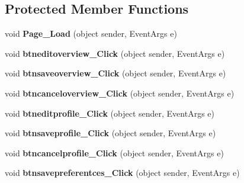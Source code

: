 \subsection*{Protected Member Functions}
\begin{DoxyCompactItemize}
\item 
\hypertarget{classadminusermanagement__details_a063fdab8b5231ee5413de3f8e4833907}{void {\bfseries Page\-\_\-\-Load} (object sender, Event\-Args e)}\label{classadminusermanagement__details_a063fdab8b5231ee5413de3f8e4833907}

\item 
\hypertarget{classadminusermanagement__details_ae156604de3f7c4ae0c2c5feb1bfb22c0}{void {\bfseries btneditoverview\-\_\-\-Click} (object sender, Event\-Args e)}\label{classadminusermanagement__details_ae156604de3f7c4ae0c2c5feb1bfb22c0}

\item 
\hypertarget{classadminusermanagement__details_a2552ef32ed38e4a1b41e90eeaeb07bff}{void {\bfseries btnsaveoverview\-\_\-\-Click} (object sender, Event\-Args e)}\label{classadminusermanagement__details_a2552ef32ed38e4a1b41e90eeaeb07bff}

\item 
\hypertarget{classadminusermanagement__details_ac9e0ff2b7b4d5953c891d78951ceef4e}{void {\bfseries btncanceloverview\-\_\-\-Click} (object sender, Event\-Args e)}\label{classadminusermanagement__details_ac9e0ff2b7b4d5953c891d78951ceef4e}

\item 
\hypertarget{classadminusermanagement__details_a2c4f51a533078554fe5128848b70bf0e}{void {\bfseries btneditprofile\-\_\-\-Click} (object sender, Event\-Args e)}\label{classadminusermanagement__details_a2c4f51a533078554fe5128848b70bf0e}

\item 
\hypertarget{classadminusermanagement__details_a6f2ee46fc7c65b4aecbdc8f5203bd530}{void {\bfseries btnsaveprofile\-\_\-\-Click} (object sender, Event\-Args e)}\label{classadminusermanagement__details_a6f2ee46fc7c65b4aecbdc8f5203bd530}

\item 
\hypertarget{classadminusermanagement__details_a3cfca8e7c4922d0bd51abf93b11973ef}{void {\bfseries btncancelprofile\-\_\-\-Click} (object sender, Event\-Args e)}\label{classadminusermanagement__details_a3cfca8e7c4922d0bd51abf93b11973ef}

\item 
\hypertarget{classadminusermanagement__details_a773d4760a9cb59830fcc1ab78951ecfd}{void {\bfseries btnsavepreferentces\-\_\-\-Click} (object sender, Event\-Args e)}\label{classadminusermanagement__details_a773d4760a9cb59830fcc1ab78951ecfd}


\end{DoxyCompactItemize}
